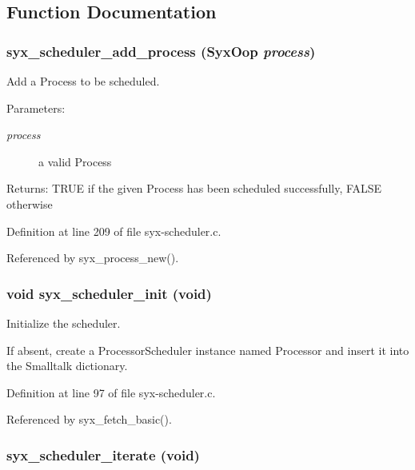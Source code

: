 \subsection{Function Documentation}
\hypertarget{syx-scheduler_8c_a79a002ea5114a6fbdea9d617e6b75e5}{
\subsubsection{ syx\_\-scheduler\_\-add\_\-process ({\bf SyxOop} {\em process})}}
\label{syx-scheduler_8c_a79a002ea5114a6fbdea9d617e6b75e5}


Add a Process to be scheduled. \begin{Desc}
\item[Parameters:]
\begin{description}
\item[{\em process}]a valid Process \end{description}
\end{Desc}
\begin{Desc}
\item[Returns:]TRUE if the given Process has been scheduled successfully, FALSE otherwise \end{Desc}


Definition at line 209 of file syx-scheduler.c.

Referenced by syx\_\-process\_\-new().\hypertarget{syx-scheduler_8c_826bd9cb537fa7b575471e55d4a22096}{
\subsubsection{\setlength{\rightskip}{0pt plus 5cm}void syx\_\-scheduler\_\-init (void)}}
\label{syx-scheduler_8c_826bd9cb537fa7b575471e55d4a22096}


Initialize the scheduler.

If absent, create a ProcessorScheduler instance named Processor and insert it into the Smalltalk dictionary. 

Definition at line 97 of file syx-scheduler.c.

Referenced by syx\_\-fetch\_\-basic().\hypertarget{syx-scheduler_8c_f057361452bd4dc5c068977fbeed3930}{
\subsubsection{ syx\_\-scheduler\_\-iterate (void)}}
\label{syx-scheduler_8c_f057361452bd4dc5c068977fbeed3930}


